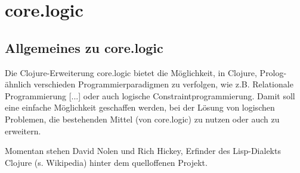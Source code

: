 \section{core.logic} 

\subsection{Allgemeines zu core.logic}

Die Clojure-Erweiterung core.logic bietet die Möglichkeit, in Clojure, Prolog-ähnlich verschieden Programmierparadigmen zu verfolgen, wie z.B. Relationale Programmierung [...] oder auch logische Constraintprogrammierung. Damit soll eine einfache Möglichkeit geschaffen werden, bei der Lösung von logischen Problemen, die bestehenden Mittel (von core.logic) zu nutzen oder auch zu erweitern.

Momentan stehen David Nolen und Rich Hickey, Erfinder des Lisp-Dialekts Clojure (s. Wikipedia) hinter dem quelloffenen Projekt.

